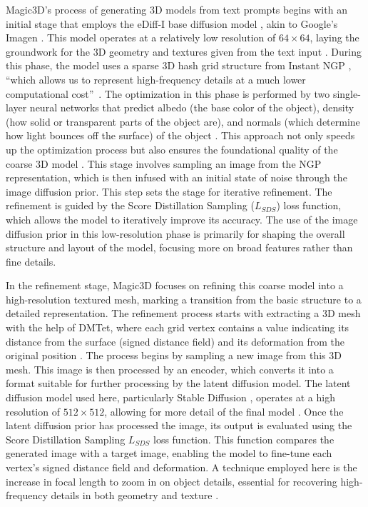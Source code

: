 Magic3D's process of generating 3D models from text prompts begins with an initial stage that employs the eDiff-I base diffusion model \citep{balaji2022eDiff-I}, akin to Google's Imagen \citep{saharia2022imagen}. This model operates at a relatively low resolution of \(64 \times 64\), laying the groundwork for the 3D geometry and textures given from the text input \citep{lin2023magic3d}. During this phase, the model uses a sparse 3D hash grid structure from Instant NGP \citep{M_ller_2022}, ``which allows us to represent high-frequency details at a much lower computational cost''~\citep{lin2023magic3d}. The optimization in this phase is performed by two single-layer neural networks that predict albedo (the base color of the object), density (how solid or transparent parts of the object are), and normals (which determine how light bounces off the surface) of the object \citep{lin2023magic3d}. This approach not only speeds up the optimization process but also ensures the foundational quality of the coarse 3D model \citep{lin2023magic3d}. 
This stage involves sampling an image from the NGP representation, which is then infused with an initial state of noise through the image diffusion prior. This step sets the stage for iterative refinement. The refinement is guided by the Score Distillation Sampling (\(L_{SDS}\)) loss function, which allows the model to iteratively improve its accuracy. The use of the image diffusion prior in this low-resolution phase is primarily for shaping the overall structure and layout of the model, focusing more on broad features rather than fine details.

In the refinement stage, Magic3D focuses on refining this coarse model into a high-resolution textured mesh, marking a transition from the basic structure to a detailed representation. The refinement process starts with extracting a 3D mesh with the help of DMTet, where each grid vertex contains a value indicating its distance from the surface (signed distance field) and its deformation from the original position \citep{shen2021DMTet, lin2023magic3d}. The process begins by sampling a new image from this 3D mesh. This image is then processed by an encoder, which converts it into a format suitable for further processing by the latent diffusion model. The latent diffusion model used here, particularly Stable Diffusion \citep{rombachStableDiffusion}, operates at a high resolution of \(512 \times 512\), allowing for more detail of the final model \citep{lin2023magic3d}. Once the latent diffusion prior has processed the image, its output is evaluated using the Score Distillation Sampling \(L_{SDS}\) loss function. This function compares the generated image with a target image, enabling the model to fine-tune each vertex's signed distance field and deformation. A technique employed here is the increase in focal length to zoom in on object details, essential for recovering high-frequency details in both geometry and texture \citep{lin2023magic3d}.

